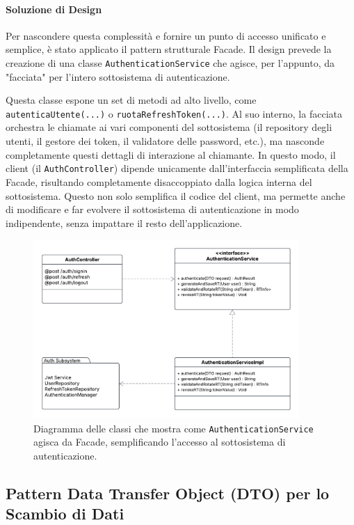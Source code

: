 \documentclass[12pt,a4paper,openright,twoside]{book}
\begin{document}
\paragraph{Soluzione di Design}
Per nascondere questa complessità e fornire un punto di accesso unificato e semplice, è stato applicato il pattern strutturale Facade. Il design prevede la creazione di una classe \texttt{AuthenticationService} che agisce, per l'appunto, da "facciata" per l'intero sottosistema di autenticazione.

Questa classe espone un set di metodi ad alto livello, come \texttt{autentica\allowbreak Utente\allowbreak (...)} o \texttt{ruota\allowbreak Refresh\allowbreak Token\allowbreak (...)}. Al suo interno, la facciata orchestra le chiamate ai vari componenti del sottosistema (il repository degli utenti, il gestore dei token, il validatore delle password, etc.), ma nasconde completamente questi dettagli di interazione al chiamante. In questo modo, il client (il \texttt{Auth\allowbreak Controller}) dipende unicamente dall'interfaccia semplificata della Facade, risultando completamente disaccoppiato dalla logica interna del sottosistema. Questo non solo semplifica il codice del client, ma permette anche di modificare e far evolvere il sottosistema di autenticazione in modo indipendente, senza impattare il resto dell'applicazione.

\begin{figure}[H]
    \centering
    \includegraphics[width=0.9\textwidth]{figures/facade.pdf}
    \caption{Diagramma delle classi che mostra come \texttt{AuthenticationService} agisca da Facade, semplificando l'accesso al sottosistema di autenticazione.}
    \label{fig:facade_uml}
\end{figure}

\subsection{Pattern Data Transfer Object (DTO) per lo Scambio di Dati}
\label{subsec:design_dto}
\end{document}
